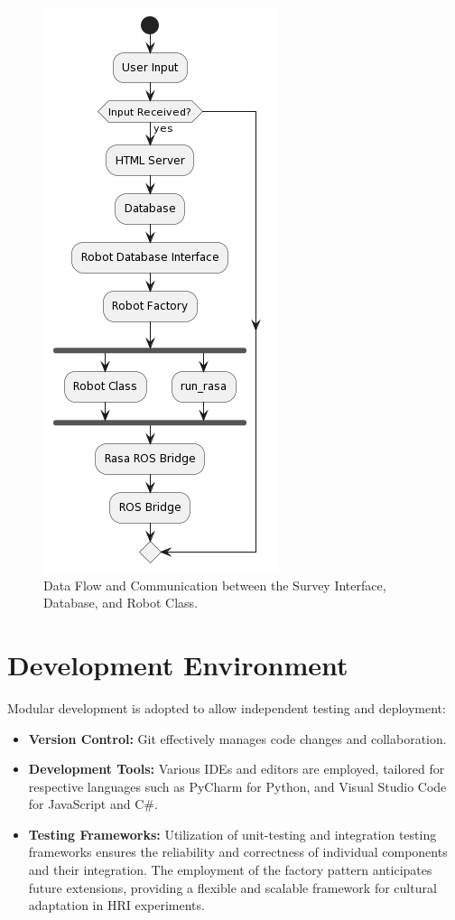 \begin{figure}
    \begin{center}
        \includegraphics[scale=0.5]{Chapter5/flow.png}  
        \caption{Data Flow and Communication between the Survey Interface, Database, and Robot Class.}
        \label{fig:figure3}
    \end{center}
\end{figure}

\section{Development Environment}

Modular development is adopted to allow independent testing and deployment:

\begin{itemize}
    \item \textbf{Version Control:} Git effectively manages code changes and collaboration.
    \item \textbf{Development Tools:} Various IDEs and editors are employed, tailored for respective languages such as PyCharm for Python, and Visual Studio Code for JavaScript and C\#.
    \item \textbf{Testing Frameworks:} Utilization of unit-testing and integration testing frameworks ensures the reliability and correctness of individual components and their integration. The employment of the factory pattern anticipates future extensions, providing a flexible and scalable framework for cultural adaptation in HRI experiments.
\end{itemize}

